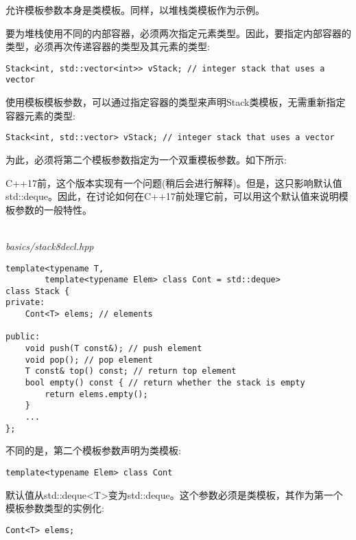 允许模板参数本身是类模板。同样，以堆栈类模板作为示例。

要为堆栈使用不同的内部容器，必须两次指定元素类型。因此，要指定内部容器的类型，必须再次传递容器的类型及其元素的类型:

\begin{lstlisting}[style=styleCXX]
Stack<int, std::vector<int>> vStack; // integer stack that uses a vector
\end{lstlisting}

使用模板模板参数，可以通过指定容器的类型来声明Stack类模板，无需重新指定容器元素的类型:

\begin{lstlisting}[style=styleCXX]
Stack<int, std::vector> vStack; // integer stack that uses a vector
\end{lstlisting}

为此，必须将第二个模板参数指定为一个双重模板参数。如下所示:

\begin{tcolorbox}[colback=webgreen!5!white,colframe=webgreen!75!black]
\hspace*{0.75cm}C++17前，这个版本实现有一个问题(稍后会进行解释)。但是，这只影响默认值std::deque。因此，在讨论如何在C++17前处理它前，可以用这个默认值来说明模板参数的一般特性。
\end{tcolorbox}

\hspace*{\fill} \\ %
\noindent
\textit{basics/stack8decl.hpp}
\begin{lstlisting}[style=styleCXX]
template<typename T,
		template<typename Elem> class Cont = std::deque>
class Stack {
private:
	Cont<T> elems; // elements
	
public:
	void push(T const&); // push element
	void pop(); // pop element
	T const& top() const; // return top element
	bool empty() const { // return whether the stack is empty
		return elems.empty();
	}
	...
};
\end{lstlisting}

不同的是，第二个模板参数声明为类模板:

\begin{lstlisting}[style=styleCXX]
template<typename Elem> class Cont
\end{lstlisting}

默认值从std::deque<T>变为std::deque。这个参数必须是类模板，其作为第一个模板参数类型的实例化:

\begin{lstlisting}[style=styleCXX]
Cont<T> elems;
\end{lstlisting}

